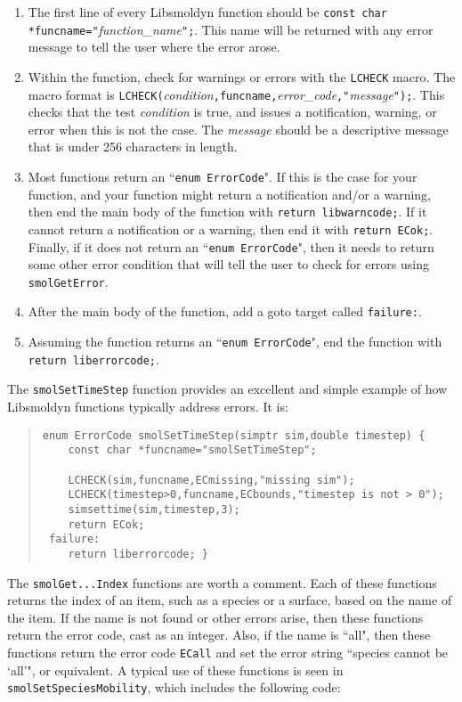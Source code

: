 \documentclass {book}
\begin{document}
\begin{enumerate}
\item The first line of every Libsmoldyn function should be \texttt{const char *funcname="}\emph{function\_name}\texttt{";}.  This name will be returned with any error message to tell the user where the error arose.
\item Within the function, check for warnings or errors with the \texttt{LCHECK} macro.  The macro format is \texttt{LCHECK(}\emph{condition}\texttt{,funcname,}\emph{error\_code}\texttt{,"}\emph{message}\texttt{");}.  This checks that the test \emph{condition} is true, and issues a notification, warning, or error when this is not the case.  The \emph{message} should be a descriptive message that is under 256 characters in length.
\item Most functions return an ``\texttt{enum ErrorCode}".  If this is the case for your function, and your function might return a notification and/or a warning, then end the main body of the function with \texttt{return libwarncode;}.  If it cannot return a notification or a warning, then end it with \texttt{return ECok;}.  Finally, if it does not return an ``\texttt{enum ErrorCode}", then it needs to return some other error condition that will tell the user to check for errors using \texttt{smolGetError}.
\item After the main body of the function, add a goto target called \texttt{failure:}.
\item Assuming the function returns an ``\texttt{enum ErrorCode}", end the function with \texttt{return liberrorcode;}.
\end{enumerate}

The \texttt{smolSetTimeStep} function provides an excellent and simple example of how Libsmoldyn functions typically address errors.  It is:

\begin{quote}
\begin{lstlisting}
enum ErrorCode smolSetTimeStep(simptr sim,double timestep) {
	const char *funcname="smolSetTimeStep";

	LCHECK(sim,funcname,ECmissing,"missing sim");
	LCHECK(timestep>0,funcname,ECbounds,"timestep is not > 0");
	simsettime(sim,timestep,3);
	return ECok;
 failure:
	return liberrorcode; }
\end{lstlisting}
\end{quote}

The \texttt{smolGet...Index} functions are worth a comment.  Each of these functions returns the index of an item, such as a species or a surface, based on the name of the item.  If the name is not found or other errors arise, then these functions return the error code, cast as an integer.  Also, if the name is ``all", then these functions return the error code \texttt{ECall} and set the error string ``species cannot be `all'", or equivalent.  A typical use of these functions is seen in \texttt{smolSetSpeciesMobility}, which includes the following code:
\end{document}
